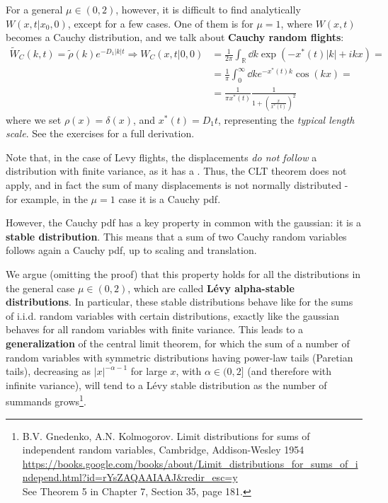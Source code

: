 \documentclass[../template.tex]{subfiles}
\begin{document}
For a general $\mu \in (0,2)$, however, it is difficult to find analytically $W(x,t|x_0,0)$, except for a few cases. One of them is for $\mu=1$, where $W(x,t)$ becomes a Cauchy distribution, and we talk about \textbf{Cauchy random flights}:
\begin{align*}
    \tilde{W}_C(k,t) = \tilde{\rho}(k) e^{-D_1 |k| t} \Rightarrow W_C(x,t|0,0) &= \frac{1}{2\pi} \int_{\mathbb{R}} \dd{k} \exp\left(-x^*(t)|k| + ikx \right) =\\
    &= \frac{1}{\pi} \int_0^\infty \dd{k} e^{-x^*(t) k} \cos(kx) = \\
    &= \frac{1}{\pi x^*(t)} \frac{1}{\displaystyle 1+ \left(\frac{x}{x^*(t)} \right)^2}   
\end{align*} 
where we set $\rho(x) = \delta(x)$, and $x^*(t) = D_1 t$, representing the \textit{typical length scale}. See the exercises for a full derivation.

\medskip

Note that, in the case of Levy flights, the displacements \textit{do not follow} a distribution with finite variance, as it has a . Thus, the CLT theorem does not apply, and in fact the sum of many displacements is not normally distributed - for example, in the $\mu=1$ case it is a Cauchy pdf.

\medskip

However, the Cauchy pdf has a key property in common with the gaussian: it is a \textbf{stable distribution}. This means that a sum of two Cauchy random variables follows again a Cauchy pdf, up to scaling and translation.

\medskip

We argue (omitting the proof) that this property holds for all the distributions in the general case $\mu \in (0,2)$, which are called \textbf{Lévy alpha-stable distributions}. In particular, these stable distributions behave like  for the sums of i.i.d. random variables with certain distributions, exactly like the gaussian behaves for all random variables with finite variance. This leads to a \textbf{generalization} of the central limit theorem, for which the sum of a number of random variables with symmetric distributions having power-law tails (Paretian tails), decreasing as $|x|^{-\alpha -1}$ for large $x$, with $\alpha \in (0,2]$ (and therefore with infinite variance), will tend to a Lévy stable distribution as the number of summands grows\footnote{B.V. Gnedenko, A.N. Kolmogorov. Limit distributions for sums of independent random variables, Cambridge, Addison-Wesley 1954 \url{https://books.google.com/books/about/Limit_distributions_for_sums_of_independ.html?id=rYsZAQAAIAAJ&redir_esc=y}\\ See Theorem 5 in Chapter 7, Section 35, page 181.}.
\end{document}
